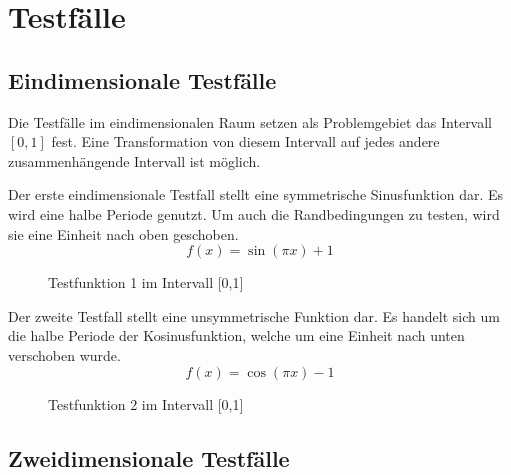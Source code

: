 \section{Testfälle}
\subsection{Eindimensionale Testfälle}

Die Testfälle im eindimensionalen Raum setzen als Problemgebiet das
Intervall $[0,1]$ fest. Eine Transformation von diesem Intervall auf jedes 
andere zusammenhängende Intervall ist möglich.

Der erste eindimensionale Testfall stellt eine symmetrische Sinusfunktion
dar. Es wird eine halbe Periode genutzt. Um auch die Randbedingungen zu testen,
wird sie eine Einheit nach oben geschoben. \begin{equation}
f(x) = \sin(\pi x)+1
\end{equation}
\begin{figure}[h]
\centering
\caption{Testfunktion 1 im Intervall [0,1]}
\label{fig:testfn1}
\end{figure}


\noindent
Der zweite Testfall stellt eine unsymmetrische Funktion dar. Es handelt sich um
die halbe Periode der Kosinusfunktion, welche um eine Einheit nach unten verschoben wurde.
\begin{equation}
f(x) = \cos(\pi x) -1
\end{equation}
\begin{figure}[h]
\centering
\caption{Testfunktion 2 im Intervall [0,1]}
\label{fig:testfn2}
\end{figure}

\clearpage
\subsection{Zweidimensionale Testfälle}

